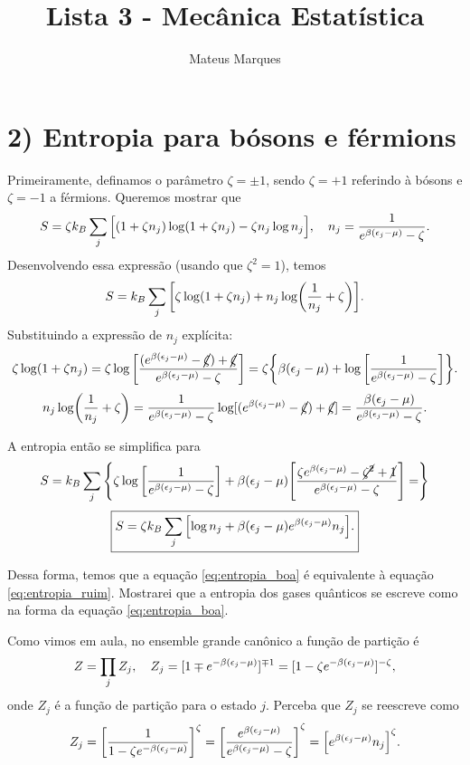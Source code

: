 \documentclass[a4paper,10pt]{article}
\title{\Huge{\textbf{Lista 3 - Mecânica Estatística}}}
\author{Mateus Marques}
\begin{document}
\maketitle

\section*{2) Entropia para bósons e férmions}

Primeiramente, definamos o parâmetro $\zeta = \pm 1$, sendo $\zeta = +1$ referindo à bósons e $\zeta = -1$ a férmions. Queremos mostrar que
\begin{equation} \label{eq:entropia_ruim}
S = \zeta k_B \sum_{j} \Big[
(1 + \zeta n_j) \log(1 + \zeta n_j) - \zeta n_j \log n_j
\Big], \quad n_j = \frac{1}{e^{\beta(\epsilon_j-\mu)} - \zeta}.
\end{equation}
Desenvolvendo essa expressão (usando que $\zeta^2 = 1$), temos
$$
S = k_B \sum_{j} \qty[
\zeta \log(1 + \zeta n_j) +
n_j \log(\frac{1}{n_j} + \zeta)
].
$$
Substituindo a expressão de $n_j$ explícita:
$$
\zeta \log(1 + \zeta n_j) =
\zeta \log\qty[\frac{(e^{\beta(\epsilon_j-\mu)}-\cancel{\zeta})+\cancel{\zeta}}{e^{\beta(\epsilon_j-\mu)}-\zeta}] =
\zeta \qty{ \beta(\epsilon_j-\mu) + \log\qty[\frac{1}{e^{\beta(\epsilon_j-\mu)}-\zeta}] }.
$$
$$
n_j \log(\frac{1}{n_j} + \zeta) = \frac{1}{e^{\beta(\epsilon_j-\mu)}-\zeta}
\log[(e^{\beta(\epsilon_j-\mu)}-\cancel{\zeta})+\cancel{\zeta}] =
\frac{\beta (\epsilon_j-\mu)}{e^{\beta(\epsilon_j-\mu)}-\zeta}.
$$

A entropia então se simplifica para
$$
S = k_B \sum_{j}
\qty{
\zeta\log\qty[\frac{1}{e^{\beta(\epsilon_j-\mu)}-\zeta}] +
\beta(\epsilon_j-\mu) \qty[\frac{\zeta e^{\beta(\epsilon_j-\mu)}-\cancel{\zeta^2}+\cancel{1}}{e^{\beta(\epsilon_j-\mu)}-\zeta}] =
}
$$
\begin{equation} \label{eq:entropia_boa}
\boxed{ S = \zeta k_B \sum_{j}
\qty[
\log n_j +
\beta(\epsilon_j-\mu) e^{\beta(\epsilon_j-\mu)} n_j
]. }
\end{equation}

Dessa forma, temos que a equação \ref{eq:entropia_boa} é equivalente à equação \ref{eq:entropia_ruim}. Mostrarei que a entropia dos gases quânticos se escreve como na forma da equação \ref{eq:entropia_boa}.

\n

Como vimos em aula, no ensemble grande canônico a função de partição é
$$
Z = \prod_j Z_j, \quad Z_j = [1 \mp e^{-\beta(\epsilon_j-\mu)}]^{\mp 1}= [1 - \zeta e^{-\beta(\epsilon_j-\mu)}]^{-\zeta},
$$
onde $Z_j$ é a função de partição para o estado $j$. Perceba que $Z_j$ se reescreve como
$$
Z_j = \qty[\frac{1}{ 1 - \zeta e^{-\beta(\epsilon_j-\mu)} }]^{\zeta} =
\qty[\frac{e^{\beta(\epsilon_j-\mu)}}{ e^{\beta(\epsilon_j-\mu)} - \zeta }]^{\zeta} =
\Big[
e^{\beta(\epsilon_j-\mu)} n_j
\Big]^{\zeta}.
$$
\end{document}
